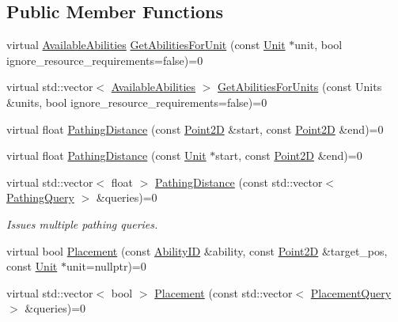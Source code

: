 \subsection*{Public Member Functions}
\begin{DoxyCompactItemize}
\item 
virtual \hyperlink{structsc2_1_1_available_abilities}{Available\+Abilities} \hyperlink{classsc2_1_1_query_interface_a76a602ebb27600b636712bd0bf062201}{Get\+Abilities\+For\+Unit} (const \hyperlink{classsc2_1_1_unit}{Unit} $\ast$unit, bool ignore\+\_\+resource\+\_\+requirements=false)=0
\item 
virtual std\+::vector$<$ \hyperlink{structsc2_1_1_available_abilities}{Available\+Abilities} $>$ \hyperlink{classsc2_1_1_query_interface_a8b50ebad97a2f1139045a61b85a3300d}{Get\+Abilities\+For\+Units} (const Units \&units, bool ignore\+\_\+resource\+\_\+requirements=false)=0
\item 
virtual float \hyperlink{classsc2_1_1_query_interface_adf72c7556e59e82e231d9c58bd093546}{Pathing\+Distance} (const \hyperlink{structsc2_1_1_point2_d}{Point2D} \&start, const \hyperlink{structsc2_1_1_point2_d}{Point2D} \&end)=0
\item 
virtual float \hyperlink{classsc2_1_1_query_interface_a757adb07f0f93e4b289ecf3ea0c4358b}{Pathing\+Distance} (const \hyperlink{classsc2_1_1_unit}{Unit} $\ast$start, const \hyperlink{structsc2_1_1_point2_d}{Point2D} \&end)=0
\item 
\mbox{\label{classsc2_1_1_query_interface_ae23848466df99bfb7c3da9fbabc7f47b}} 
virtual std\+::vector$<$ float $>$ \hyperlink{classsc2_1_1_query_interface_ae23848466df99bfb7c3da9fbabc7f47b}{Pathing\+Distance} (const std\+::vector$<$ \hyperlink{structsc2_1_1_query_interface_1_1_pathing_query}{Pathing\+Query} $>$ \&queries)=0
\begin{DoxyCompactList}\small\item\em Issues multiple pathing queries. \end{DoxyCompactList}\item 
virtual bool \hyperlink{classsc2_1_1_query_interface_aa5ee0fbda6e0eac6f096710328484d2a}{Placement} (const \hyperlink{classsc2_1_1_s_c2_type}{Ability\+ID} \&ability, const \hyperlink{structsc2_1_1_point2_d}{Point2D} \&target\+\_\+pos, const \hyperlink{classsc2_1_1_unit}{Unit} $\ast$unit=nullptr)=0
\item 
virtual std\+::vector$<$ bool $>$ \hyperlink{classsc2_1_1_query_interface_a470e79785e2ffdb1a5c4636c8a070601}{Placement} (const std\+::vector$<$ \hyperlink{structsc2_1_1_query_interface_1_1_placement_query}{Placement\+Query} $>$ \&queries)=0
\end{DoxyCompactItemize}


